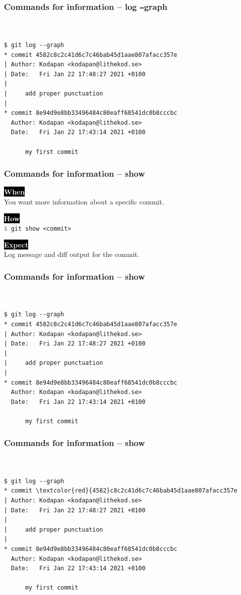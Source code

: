 \documentclass{beamer}
\newcommand{\keyword}[1]{\hspace{-1.0em}\colorbox{black}{\textcolor{white}{\textbf{#1}\vphantom{Ep}}}\vspace{0.2em}} %
\newcommand{\command}[1]{\texttt{\textcolor{gray}{\$} {#1}}}
\begin{document}
\begin{frame}[fragile]
  \frametitle{Commands for information -- log \texttt{--}graph}
\begin{Verbatim}[commandchars=\\\{\}]


$ git log --graph
* commit 4582c8c2c41d6c7c46bab45d1aae807afacc357e
| Author: Kodapan <kodapan@lithekod.se>
| Date:   Fri Jan 22 17:48:27 2021 +0100
| 
|     add proper punctuation
| 
* commit 8e94d9e8bb33496484c80eaff68541dc0b8cccbc
  Author: Kodapan <kodapan@lithekod.se>
  Date:   Fri Jan 22 17:43:14 2021 +0100
  
      my first commit
\end{Verbatim}
\end{frame}

\begin{frame}
  \frametitle{Commands for information -- show}

  \keyword{When}\\
  You want more information about a specific commit.
  \vspace{0.5em}

  \keyword{How}\\
  \command{git show <commit>}
  \vspace{0.5em}

  \keyword{Expect}\\
  Log message and diff output for the commit.
\end{frame}

\begin{frame}[fragile]
  \frametitle{Commands for information -- show}
\begin{Verbatim}[commandchars=\\\{\}]


$ git log --graph
* commit 4582c8c2c41d6c7c46bab45d1aae807afacc357e
| Author: Kodapan <kodapan@lithekod.se>
| Date:   Fri Jan 22 17:48:27 2021 +0100
| 
|     add proper punctuation
| 
* commit 8e94d9e8bb33496484c80eaff68541dc0b8cccbc
  Author: Kodapan <kodapan@lithekod.se>
  Date:   Fri Jan 22 17:43:14 2021 +0100
  
      my first commit
\end{Verbatim}
\end{frame}

\begin{frame}[fragile]
  \frametitle{Commands for information -- show}
\begin{Verbatim}[commandchars=\\\{\}]


$ git log --graph
* commit \textcolor{red}{4582}c8c2c41d6c7c46bab45d1aae807afacc357e
| Author: Kodapan <kodapan@lithekod.se>
| Date:   Fri Jan 22 17:48:27 2021 +0100
| 
|     add proper punctuation
| 
* commit 8e94d9e8bb33496484c80eaff68541dc0b8cccbc
  Author: Kodapan <kodapan@lithekod.se>
  Date:   Fri Jan 22 17:43:14 2021 +0100
  
      my first commit
\end{Verbatim}
\end{frame}
\end{document}

